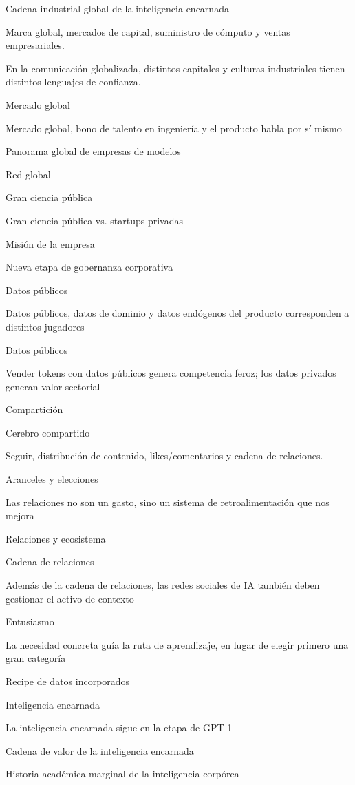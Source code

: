 \documentclass{article}
\begin{document}
Cadena industrial global de la inteligencia encarnada

Marca global, mercados de capital, suministro de cómputo y ventas empresariales.

En la comunicación globalizada, distintos capitales y culturas industriales tienen distintos lenguajes de confianza.

Mercado global

Mercado global, bono de talento en ingeniería y el producto habla por sí mismo

Panorama global de empresas de modelos

Red global

Gran ciencia pública

Gran ciencia pública vs. startups privadas

Misión de la empresa

Nueva etapa de gobernanza corporativa

Datos públicos

Datos públicos, datos de dominio y datos endógenos del producto corresponden a distintos jugadores

Datos públicos

Vender tokens con datos públicos genera competencia feroz; los datos privados generan valor sectorial

Compartición

Cerebro compartido

Seguir, distribución de contenido, likes/comentarios y cadena de relaciones.

Aranceles y elecciones

Las relaciones no son un gasto, sino un sistema de retroalimentación que nos mejora

Relaciones y ecosistema

Cadena de relaciones

Además de la cadena de relaciones, las redes sociales de IA también deben gestionar el activo de contexto

Entusiasmo

La necesidad concreta guía la ruta de aprendizaje, en lugar de elegir primero una gran categoría

Recipe de datos incorporados

Inteligencia encarnada

La inteligencia encarnada sigue en la etapa de GPT-1

Cadena de valor de la inteligencia encarnada

Historia académica marginal de la inteligencia corpórea
\end{document}
